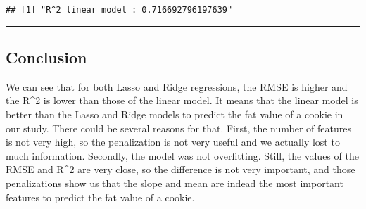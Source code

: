 \documentclass[
]{article}
\begin{document}
\begin{verbatim}
## [1] "R^2 linear model : 0.716692796197639"
\end{verbatim}

\begin{center}\rule{0.5\linewidth}{0.5pt}\end{center}

\subsection{Conclusion}\label{conclusion}

We can see that for both Lasso and Ridge regressions, the RMSE is higher
and the R\^{}2 is lower than those of the linear model. It means that
the linear model is better than the Lasso and Ridge models to predict
the fat value of a cookie in our study. There could be several reasons
for that. First, the number of features is not very high, so the
penalization is not very useful and we actually lost to much
information. Secondly, the model was not overfitting. Still, the values
of the RMSE and R\^{}2 are very close, so the difference is not very
important, and those penalizations show us that the slope and mean are
indead the most important features to predict the fat value of a cookie.
\end{document}
